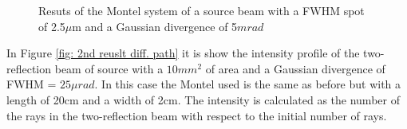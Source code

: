 \begin{figure}[]
%
\centering
%
%
\quad
%
%
\caption{Resuts of the Montel system of a source beam with a FWHM spot of 2.5$\mu $m and a Gaussian divergence of 5$mrad $}
%
\label{fig: reuslt diff. path}
%
\end{figure}
In Figure \ref{fig: 2nd reuslt diff. path} it is show the intensity profile of the two-reflection beam of source with a $10 mm^2 $ of area and a Gaussian divergence of FWHM = $25 \mu rad $. In this case the Montel used is the same as before but with a length of 20cm and a width of 2cm.  The intensity is calculated as the number of the rays in the two-reflection beam with respect to the initial number of rays. 
